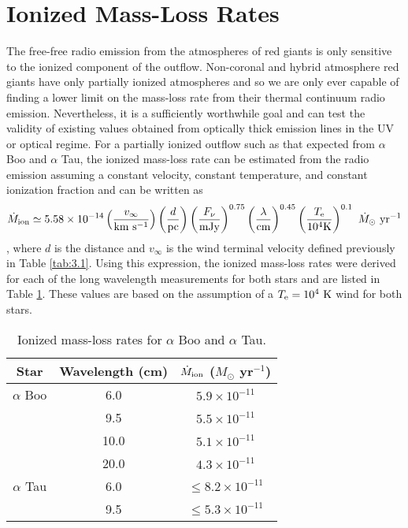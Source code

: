 \section{Ionized Mass-Loss Rates}\label{sec:6.5b}

The free-free radio emission from the atmospheres of red giants is only sensitive to the ionized component of the outflow. Non-coronal and hybrid atmosphere red giants have only partially ionized atmospheres and so we are only ever capable of finding a lower limit on the mass-loss rate from their thermal continuum radio emission. Nevertheless, it is a sufficiently worthwhile goal and can test the validity of existing values obtained from optically thick emission lines in the UV or optical regime. For a partially ionized outflow such as that expected from $\alpha$ Boo and $\alpha$ Tau, the ionized mass-loss rate can be estimated from the radio emission assuming a constant velocity, constant temperature, and constant ionization fraction and can be written as  
\begin{equation}
\dot{M}_{\rm{ion}} \simeq 5.58 \times 10^{-14} \left(\frac{v_{\infty}}{\rm{km \  s^{-1}}}\right) \left(\frac{d}{\rm{pc}}\right)\left( \frac{F_{\nu}}{\rm{mJy}} \right)^{0.75} \left( \frac{\lambda}{\rm{cm}} \right)^{0.45} \left( \frac{T_{\rm{e}}}{10^4 \rm{K}} \right)^{0.1} \ \dot{M}_{\odot} \ \rm{yr}^{-1} 
\label{eq:6.5b}
\end{equation}
\citep[e.g.,][]{drake_1986}, where $d$ is the distance and $v_{\infty}$ is the wind terminal velocity defined previously in Table \ref{tab:3.1}. Using this expression, the ionized mass-loss rates were derived for each of the long wavelength measurements for both stars and are listed in Table \ref{tab:6.5b}. These values are based on the assumption of a $T_{\rm{e}} = 10^4 \ \rm{K}$  wind for both stars. 

\begin{table}[!hb]
\begin{center}
\caption[Ionized Mass-loss Rates for $\alpha$ Boo and $\alpha$ Tau]{Ionized mass-loss rates for $\alpha$ Boo and $\alpha$ Tau.}
\begin{tabular}{ccc}
\hline
\hline
\rule{0pt}{2.5ex}Star & Wavelength (cm) & $\dot{M} _{\rm{ion}}$ ($M _{\odot}$ yr$^{-1}$) \\
\hline
\rule{0pt}{2.5ex}$\alpha$ Boo				& 6.0  & $5.9 \times 10^{-11}$ \\
							& 9.5  & $5.5 \times 10^{-11}$ \\
							& 10.0  & $5.1 \times 10^{-11}$ \\
							& 20.0  & $4.3 \times 10^{-11}$ \\
$\alpha$ Tau				& 6.0  & $\leq 8.2 \times 10^{-11}$ \\
							& 9.5 & $\leq 5.3 \times 10^{-11}$ \\
\hline
\end{tabular}
\label{tab:6.5b}
\end{center}
\end{table}

